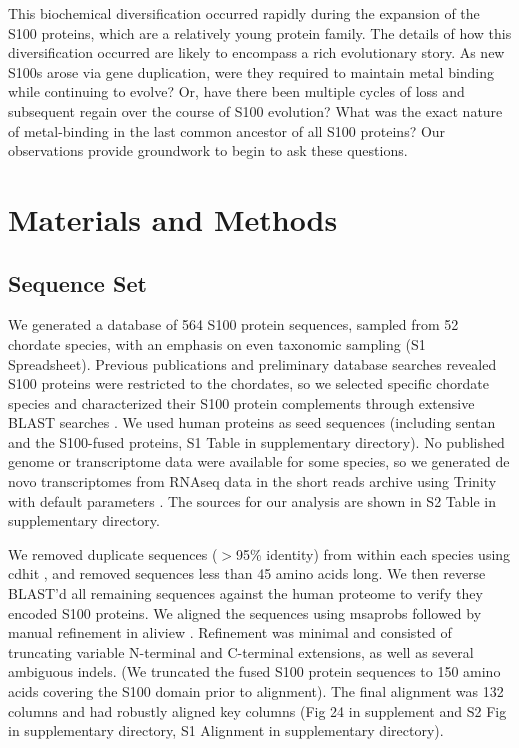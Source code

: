 This biochemical diversification occurred rapidly during the expansion
of the S100 proteins, which are a relatively young protein family.
The details of how this diversification occurred are likely to encompass
a rich evolutionary story. As new S100s arose via gene duplication,
were they required to maintain metal binding while continuing to evolve?
Or, have there been multiple cycles of loss and subsequent regain
over the course of S100 evolution? What was the exact nature of metal-binding
in the last common ancestor of all S100 proteins? Our observations
provide groundwork to begin to ask these questions.

\section{Materials and Methods}

\subsection{Sequence Set}

We generated a database of 564 S100 protein sequences, sampled from
52 chordate species, with an emphasis on even taxonomic sampling (S1
Spreadsheet). Previous publications and preliminary database searches
revealed S100 proteins were restricted to the chordates, \cite{zimmer_evolution_2013,marenholz_s100_2004,kraemer_structural_2008}
so we selected specific chordate species and characterized their S100
protein complements through extensive BLAST searches \cite{altschul_basic_1990}.
We used human proteins as seed sequences (including sentan and the
S100-fused proteins, S1 Table in supplementary directory). No published genome or transcriptome
data were available for some species, so we generated de novo transcriptomes
from RNAseq data in the short reads archive \cite{leinonen_sequence_2011}
using Trinity with default parameters \cite{grabherr_trinity:_2011}.
The sources for our analysis are shown in S2 Table in supplementary directory.

We removed duplicate sequences ($>$95\% identity) from within each
species using cdhit \cite{li_clustering_2001}, and removed sequences
less than 45 amino acids long. We then reverse BLAST'd all remaining
sequences against the human proteome to verify they encoded S100 proteins.
We aligned the sequences using msaprobs \cite{liu_msaprobs:_2010}
followed by manual refinement in aliview \cite{larsson_aliview:_2014}.
Refinement was minimal and consisted of truncating variable N-terminal
and C-terminal extensions, as well as several ambiguous indels. (We
truncated the fused S100 protein sequences to 150 amino acids covering
the S100 domain prior to alignment). The final alignment was 132 columns
and had robustly aligned key columns (Fig 24 in supplement and S2 Fig in supplementary directory, S1 Alignment in supplementary directory).


